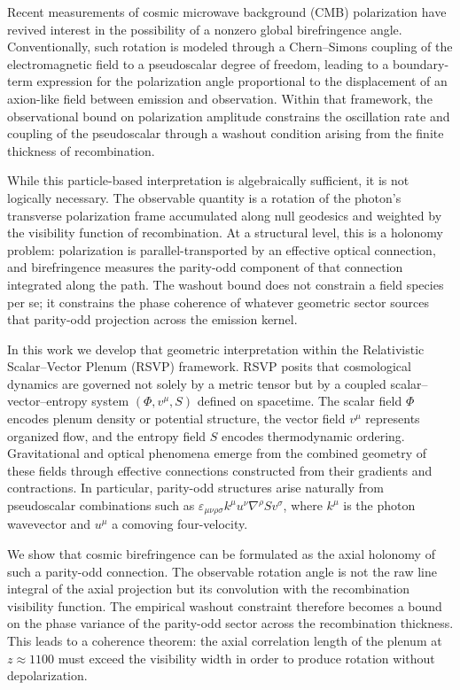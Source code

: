 \documentclass[12pt]{article}
\begin{document}
Recent measurements of cosmic microwave background (CMB) polarization have revived interest in the possibility of a nonzero global birefringence angle. Conventionally, such rotation is modeled through a Chern--Simons coupling of the electromagnetic field to a pseudoscalar degree of freedom, leading to a boundary-term expression for the polarization angle proportional to the displacement of an axion-like field between emission and observation. Within that framework, the observational bound on polarization amplitude constrains the oscillation rate and coupling of the pseudoscalar through a washout condition arising from the finite thickness of recombination.

While this particle-based interpretation is algebraically sufficient, it is not logically necessary. The observable quantity is a rotation of the photon’s transverse polarization frame accumulated along null geodesics and weighted by the visibility function of recombination. At a structural level, this is a holonomy problem: polarization is parallel-transported by an effective optical connection, and birefringence measures the parity-odd component of that connection integrated along the path. The washout bound does not constrain a field species per se; it constrains the phase coherence of whatever geometric sector sources that parity-odd projection across the emission kernel.

In this work we develop that geometric interpretation within the Relativistic Scalar--Vector Plenum (RSVP) framework. RSVP posits that cosmological dynamics are governed not solely by a metric tensor but by a coupled scalar--vector--entropy system $(\Phi, v^\mu, S)$ defined on spacetime. The scalar field $\Phi$ encodes plenum density or potential structure, the vector field $v^\mu$ represents organized flow, and the entropy field $S$ encodes thermodynamic ordering. Gravitational and optical phenomena emerge from the combined geometry of these fields through effective connections constructed from their gradients and contractions. In particular, parity-odd structures arise naturally from pseudoscalar combinations such as $\varepsilon_{\mu\nu\rho\sigma} k^\mu u^\nu \nabla^\rho S v^\sigma$, where $k^\mu$ is the photon wavevector and $u^\mu$ a comoving four-velocity.

We show that cosmic birefringence can be formulated as the axial holonomy of such a parity-odd connection. The observable rotation angle is not the raw line integral of the axial projection but its convolution with the recombination visibility function. The empirical washout constraint therefore becomes a bound on the phase variance of the parity-odd sector across the recombination thickness. This leads to a coherence theorem: the axial correlation length of the plenum at $z \approx 1100$ must exceed the visibility width in order to produce rotation without depolarization.
\end{document}
